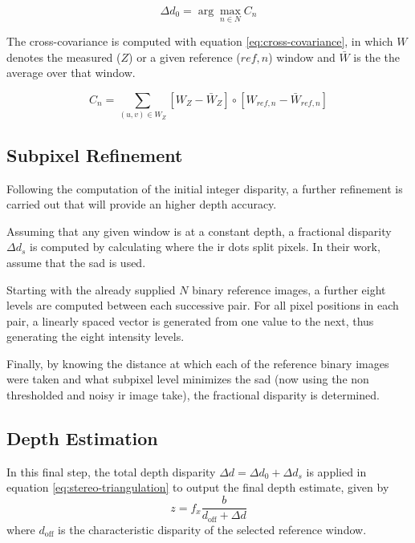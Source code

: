 \documentclass[journal]{IEEEtran}
\begin{document}
\begin{equation}
    \Delta d_0 = \arg\max_{n \in N} C_n
    \label{eq:delta_d0}
\end{equation}

The cross-covariance is computed with equation \ref{eq:cross-covariance}, in which $W$ denotes the measured ($Z$) or a given reference ($ref,n$) window and $\bar{W}$ is the the average over that window.

\begin{equation}
    C_n = \sum_{(u,v) \in W_Z} [W_Z - \bar{W}_Z] \circ [W_{ref,n} - \bar{W}_{ref,n}]
    \label{eq:cross-covariance}
\end{equation}

\subsection{Subpixel Refinement}

Following the computation of the initial integer disparity, a further refinement is carried out that will provide an higher depth accuracy. 

Assuming that any given window is at a constant depth, a fractional disparity $\Delta d_s$ is computed by calculating where the \gls{ir} dots split pixels. In their work, \cite{landau2016kinect} assume that the \gls{sad} is used.

Starting with the already supplied $N$ binary reference images, a further eight levels are computed between each successive pair. For all pixel positions in each pair, a linearly spaced vector is generated from one value to the next, thus generating the eight intensity levels.

Finally, by knowing the distance at which each of the reference binary images were taken and what subpixel level minimizes the \gls{sad} (now using the non thresholded and noisy \gls{ir} image take), the fractional disparity is determined. 
\subsection{Depth Estimation}
\label{subsec:depth_estimation}

In this final step, the total depth disparity $\Delta d = \Delta d_0 + \Delta d_s$ is applied in equation \ref{eq:stereo-triangulation} to output the final depth estimate, given by
%
\begin{equation}
    z = f_x \frac{b}{d_{\text{off}}+\Delta d}
    \label{eq:final_depth_estimate}
\end{equation}
%
where $d_{\text{off}}$ is the characteristic disparity of the selected reference window.
\end{document}
